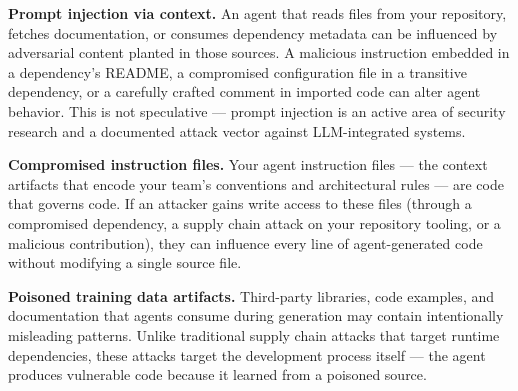 \documentclass[
  a4paper,
  DIV=11,
  numbers=noendperiod]{scrreprt}
\begin{document}
\textbf{Prompt injection via context.} An agent that reads files from
your repository, fetches documentation, or consumes dependency metadata
can be influenced by adversarial content planted in those sources. A
malicious instruction embedded in a dependency's README, a compromised
configuration file in a transitive dependency, or a carefully crafted
comment in imported code can alter agent behavior. This is not
speculative --- prompt injection is an active area of security research
and a documented attack vector against LLM-integrated systems.

\textbf{Compromised instruction files.} Your agent instruction files ---
the context artifacts that encode your team's conventions and
architectural rules --- are code that governs code. If an attacker gains
write access to these files (through a compromised dependency, a supply
chain attack on your repository tooling, or a malicious contribution),
they can influence every line of agent-generated code without modifying
a single source file.

\textbf{Poisoned training data artifacts.} Third-party libraries, code
examples, and documentation that agents consume during generation may
contain intentionally misleading patterns. Unlike traditional supply
chain attacks that target runtime dependencies, these attacks target the
development process itself --- the agent produces vulnerable code
because it learned from a poisoned source.
\end{document}
